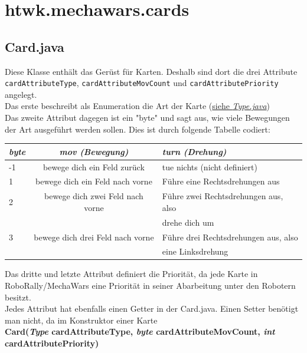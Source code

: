 \documentclass[12pt,a4paper,oneside]{book}
\theoremstyle{plain}
\numberwithin{equation}{chapter} \DeclareMathOperator{\Var}{Var}
\begin{document}
\newpage
\section{htwk.mechawars.cards}
\hypertarget{Card.java}{}
\subsection{Card.java}
    Diese Klasse enthält das Gerüst für Karten. Deshalb sind dort die drei Attribute \texttt{cardAttributeType}, \texttt{cardAttributeMovCount} und \texttt{cardAttributePriority} angelegt. \\
    Das erste beschreibt als Enumeration die Art der Karte (\hyperlink{Type.java}{siehe \textit{Type.java}}) \\
    Das zweite Attribut dagegen ist ein "byte" und sagt aus, wie viele Bewegungen der Art ausgeführt werden sollen. Dies ist durch folgende Tabelle codiert: \\
    \begin{center} \begin{longtable}{|l|c|l|}
    \hline
    \textit{byte}   & \textit{mov (Bewegung)}           & \textit{turn (Drehung)} \\ \hline
    -1              & bewege dich ein Feld zurück       & tue nichts (nicht definiert)\\ \hline
    1               & bewege dich ein Feld nach vorne   & Führe eine Rechtsdrehungen aus\\\hline
    2               & bewege dich zwei Feld nach vorne  & Führe zwei Rechtsdrehungen aus, also\\
                    &                                   & drehe dich um\\\hline
    3               & bewege dich drei Feld nach vorne  & Führe drei Rechtsdrehungen aus, also\\
                    &                                   & eine Linksdrehung\\\hline
    \end{longtable} \end{center}
    Das dritte und letzte Attribut definiert die Priorität, da jede Karte in RoboRally/MechaWars eine Priorität in seiner Abarbeitung unter den Robotern besitzt. \\
    Jedes Attribut hat ebenfalls einen Getter in der Card.java. Einen Setter benötigt man nicht, da im Konstruktor einer Karte \\
    \textbf{Card(\textit{Type} cardAttributeType, \textit{byte} cardAttributeMovCount, \textit{int} cardAttributePriority)}\\
\end{document}
